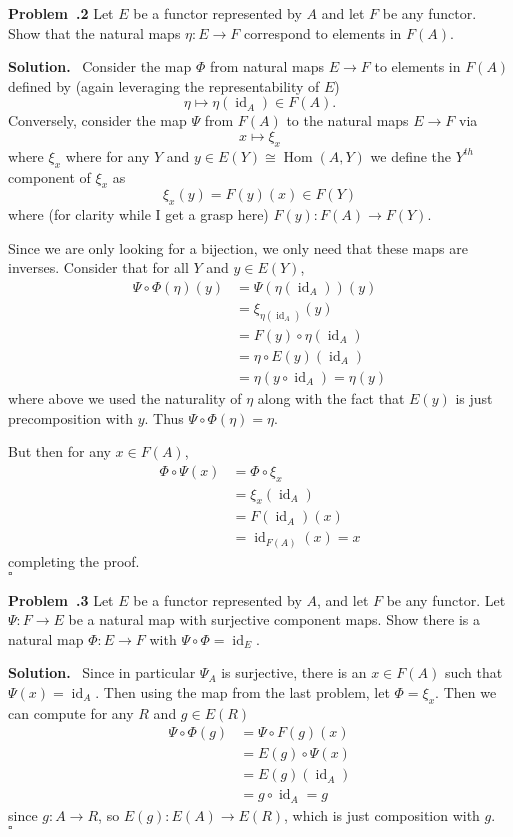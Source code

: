 \documentclass[12pt]{article}
\DeclareMathOperator{\Hom}{Hom}
\newenvironment{prob}[1]{\par\smallskip
	\noindent\begin{mdframed}\small \textbf{Problem~\thesection.#1} \rmfamily\quad}{\end{mdframed}\medskip}
\newenvironment{sol}{\noindent \textbf{Solution.} \,}{\\\hspace*{\fill}$\square$\medskip}
\begin{document}
\begin{prob}{2}
	Let $E$ be a functor represented by $A$ and let $F$ be any functor. Show that the natural
	maps $\eta:E\to F$ correspond to elements in $F(A)$.
\end{prob}
\begin{sol}
	Consider the map $\Phi$ from natural maps $E\to F$ to elements in $F(A)$ defined by
	(again leveraging the representability of $E$)
	\[\eta\mapsto \eta(\operatorname{id}_A)\in F(A).\]
	Conversely, consider the map $\Psi$ from $F(A)$ to the natural maps $E\to F$ via
	\[x\mapsto \xi_x\]
	where $\xi_x$ where for any $Y$ and $y\in E(Y)\cong \Hom(A,Y)$ we define the $Y^{th}$ component of $\xi_x$
	as 
	\[\xi_x(y)=F(y)(x)\in F(Y)\]
	where (for clarity while I get a grasp here) $F(y):F(A)\to F(Y)$.

	Since we are only looking for a bijection, we only need that these maps are inverses.
	Consider that for all $Y$ and $y\in E(Y)$,
	\begin{align*}
		\Psi\circ\Phi(\eta)(y)&=\Psi\left(\eta(\operatorname{id}_A)\right)(y)\\
		&= \xi_{\eta(\operatorname{id}_A)}(y)\\
		&= F(y)\circ \eta (\operatorname{id}_A)\\
		&= \eta\circ E(y) (\operatorname{id}_A)\\
		&= \eta(y\circ\operatorname{id}_A)=\eta(y)
	\end{align*}
	where above we used the naturality of $\eta$ along with the fact that $E(y)$ is just
	precomposition with $y$. Thus $\Psi\circ\Phi(\eta)=\eta.$

	But then for any $x\in F(A)$,
	\begin{align*}
		\Phi\circ\Psi(x)&=\Phi\circ\xi_x\\
		&=\xi_x(\operatorname{id}_A)\\
		&=F(\operatorname{id}_A)(x)\\
		&=\operatorname{id}_{F(A)}(x)=x
	\end{align*}
	completing the proof.
\end{sol}

\begin{prob}{3}
	Let $E$ be a functor represented by $A$, and let $F$ be any functor. Let $\Psi:F\to E$
	be a natural map with surjective component maps. Show there is a natural map $\Phi:E\to F$
	with $\Psi\circ\Phi=\operatorname{id}_E$.
\end{prob}
\begin{sol}
	Since in particular $\Psi_A$ is surjective, there is an $x\in F(A)$ such that $\Psi(x)=\operatorname{id}_A$.
	Then using the map from the last problem, let $\Phi=\xi_x$. Then we can compute for any $R$ and $g\in E(R)$
	\begin{align*}
		\Psi\circ\Phi (g) &= \Psi\circ F(g) (x)\\
		&=E(g)\circ \Psi(x)\\
		&=E(g)(\operatorname{id}_A)\\
		&=g\circ \operatorname{id}_A=g
	\end{align*}
	since $g:A\to R$, so $E(g):E(A)\to E(R)$, which is just composition with $g$.
\end{sol}
\end{document}
